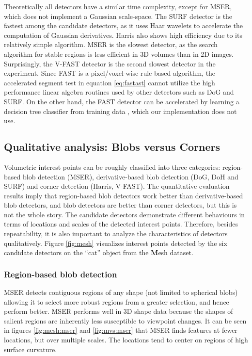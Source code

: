 Theoretically all detectors have a similar time complexity, except for MSER, which does not implement a Gaussian scale-space. The SURF detector is the fastest among the candidate detectors, as it uses Haar wavelets to accelerate the computation of Gaussian derivatives. Harris also shows high efficiency due to its relatively simple algorithm. MSER is the slowest detector, as the search algorithm for stable regions is less efficient in 3D volumes than in 2D images. Surprisingly, the V-FAST detector is the second slowest detector in the experiment. Since FAST is a pixel/voxel-wise rule based algorithm, the accelerated segment test in equation \ref{eq:fastast} cannot utilize the high performance linear algebra routines used by other detectors such as DoG and SURF. On the other hand, the FAST detector can be accelerated by learning a decision tree classifier from training data \cite{Rosten2010}, which our implementation does not use.

\subsection{Qualitative analysis: Blobs versus Corners}
Volumetric interest points can be roughly classified into three categories: region-based blob detection (MSER), derivative-based blob detection (DoG, DoH and SURF) and corner detection (Harris, V-FAST). The quantitative evaluation results imply that region-based blob detectors work better than derivative-based blob detectors, and blob detectors are better than corner detectors, but this is not the whole story. The candidate detectors demonstrate different behaviours in terms of locations and scales of the detected interest points. Therefore, besides repeatability, it is also important to analyze the characteristics of detectors qualitatively. Figure \ref{fig:mesh} visualizes interest points detected by the six candidate detectors on the ``cat'' object from the {\textbf Mesh} dataset.

\subsubsection{Region-based blob detection} MSER detects contiguous regions of any shape (\ie not limited to spherical blobs) allowing it to select more robust regions from a greater selection, and hence perform better. MSER performs well in 3D shape data because the shapes of salient regions are inherently less susceptible to viewpoint changes. It can be seen in figures \ref{fig:mesh:mser} and \ref{fig:mvs:mser} that MSER finds features at fewer locations, but over multiple scales. The locations tend to center on regions of high surface curvature.

